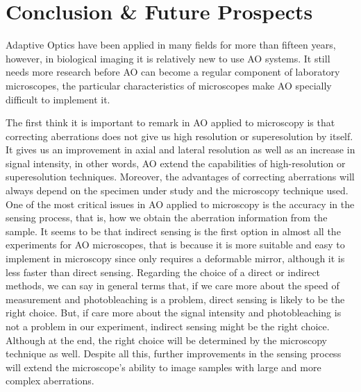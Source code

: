 \section{Conclusion \& Future Prospects}
\label{sec:Future}

Adaptive Optics have been applied in many fields for more than fifteen years, however, in biological imaging it is relatively new to use AO systems. It still needs more research before AO can become a regular component of laboratory microscopes, the particular characteristics of microscopes make AO specially difficult to implement it.  

The first think it is important to remark in AO applied to microscopy is that correcting aberrations does not give us high resolution or superesolution by itself. It gives us an improvement in axial and lateral resolution as well as an increase in signal intensity, in other words, AO extend the capabilities of high-resolution or superesolution techniques. Moreover, the advantages of correcting aberrations will always depend on the specimen under study and the microscopy technique used. One of the most critical issues in AO applied to microscopy is the accuracy in the sensing process, that is, how we obtain the aberration information from the sample. It seems to be that indirect sensing is the first option in almost all the experiments for AO microscopes, that is because it is more suitable and easy to implement in microscopy since only requires a deformable mirror, although it is less faster than direct sensing. Regarding the choice of a direct or indirect methods, we can say in general terms that, if we care more about the speed of measurement and photobleaching is a problem, direct sensing is likely to be the right choice. But, if care more about the signal intensity and photobleaching is not a problem in our experiment, indirect sensing might be the right choice. Although at the end, the right choice will be determined by the microscopy technique as well. Despite all this, further improvements in the sensing process will extend the microscope’s ability to image samples with large and more complex aberrations.

